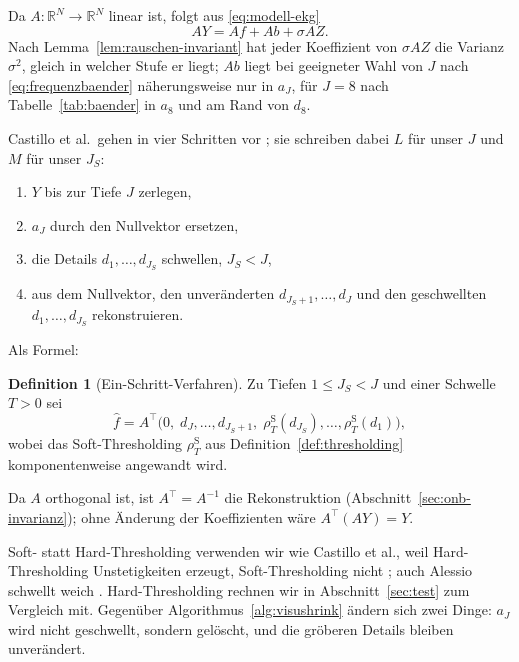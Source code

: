 \documentclass[a4paper,11pt,bibliography=totoc,listof=totoc,headinclude=true,cleardoublepage=empty,oneside]{scrbook}
\theoremstyle{plain}
\theoremstyle{definition}
\newtheorem{Definition}[Satz]{Definition}
\newcommand{\R}{\mathbb{R}}
\begin{document}
Da $A\colon\R^N\to\R^N$ linear ist, folgt aus \eqref{eq:modell-ekg}
\begin{equation}
\label{eq:modell-koeff}
  AY = Af + Ab + \sigma AZ .
\end{equation}
Nach Lemma~\ref{lem:rauschen-invariant} hat jeder Koeffizient von $\sigma AZ$
die Varianz $\sigma^2$, gleich in welcher Stufe er liegt; $Ab$ liegt bei
geeigneter Wahl von $J$ nach \eqref{eq:frequenzbaender} näherungsweise nur in
$a_J$, für $J = 8$ nach Tabelle~\ref{tab:baender} in $a_8$ und am Rand von
$d_8$.

Castillo et al.\ gehen in vier Schritten vor \cite[Abschn.~3]{castillo}; %
sie schreiben dabei $L$ für unser $J$ und $M$ für unser $J_S$:
\begin{enumerate}
\item $Y$ bis zur Tiefe $J$ zerlegen,
\item $a_J$ durch den Nullvektor ersetzen,
\item die Details $d_1, \dots, d_{J_S}$ schwellen, $J_S < J$,
\item aus dem Nullvektor, den unveränderten $d_{J_S+1}, \dots, d_J$ und den
  geschwellten $d_1, \dots, d_{J_S}$ rekonstruieren.
\end{enumerate}
Als Formel:

\begin{Definition}[Ein-Schritt-Verfahren]
\label{def:ein-schritt}
Zu Tiefen $1 \le J_S < J$ und einer Schwelle $T > 0$ sei
\begin{equation}
\label{eq:ein-schritt}
  \hat f = A^\top\bigl(0,\; d_J, \dots, d_{J_S+1},\;
  \rho^{\mathrm S}_T(d_{J_S}), \dots, \rho^{\mathrm S}_T(d_1)\bigr),
\end{equation}
wobei das Soft-Thresholding $\rho^{\mathrm S}_T$ aus
Definition~\ref{def:thresholding} komponentenweise angewandt wird.
\end{Definition}

Da $A$ orthogonal ist, ist $A^\top = A^{-1}$ die Rekonstruktion
(Abschnitt~\ref{sec:onb-invarianz}); ohne Änderung der Koeffizienten wäre
$A^\top(AY) = Y$.

Soft- statt Hard-Thresholding verwenden wir wie Castillo et al., weil
Hard-Thresholding Unstetigkeiten erzeugt, Soft-Thresholding nicht
\cite[Abschn.~3.1.6]{castillo}; %
auch Alessio schwellt weich \cite[Kap.~15.2.1]{alessio}. %
Hard-Thresholding rechnen wir in Abschnitt~\ref{sec:test} zum Vergleich
mit. Gegenüber Algorithmus~\ref{alg:visushrink} ändern sich zwei Dinge: $a_J$
wird nicht geschwellt, sondern gelöscht, und die gröberen Details bleiben
unverändert.
 
\end{document}
